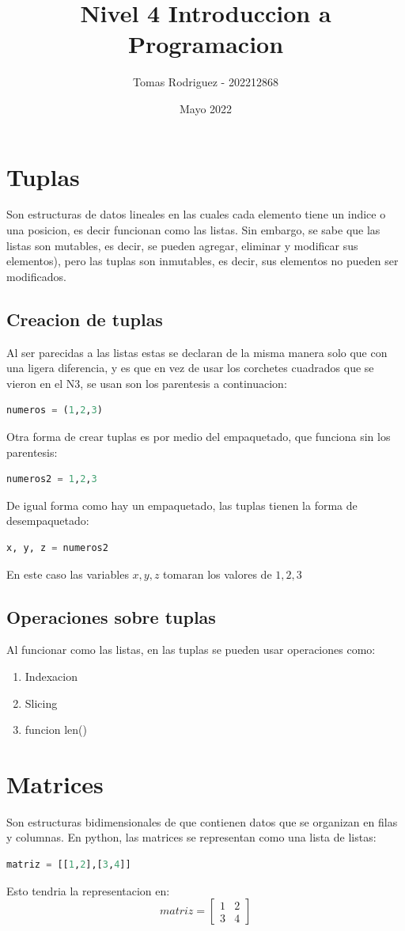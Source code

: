 \documentclass{article}
\title{Nivel 4 Introduccion a Programacion}
\author{Tomas Rodriguez - 202212868}
\date{Mayo 2022}
\begin{document}
\maketitle
\section{Tuplas}
Son estructuras de datos lineales en las cuales cada elemento tiene un indice o una posicion, es decir funcionan como las listas. Sin embargo, se sabe que las listas son mutables, es decir, se pueden agregar, eliminar y modificar sus elementos), pero las tuplas  son inmutables, es decir, sus elementos no pueden ser modificados.
\subsection{Creacion de tuplas}
Al ser parecidas a las listas estas se declaran de la misma manera solo que con una ligera diferencia, y es que en vez de usar los corchetes cuadrados que se vieron en el N3, se usan son los parentesis a continuacion:
\begin{lstlisting}[language=Python, caption= Declaracion Tupla parentesis]
numeros = (1,2,3)
\end{lstlisting}
Otra forma de crear tuplas es por medio del empaquetado, que funciona sin los parentesis:
\begin{lstlisting}[language=Python, caption= Empaquetado en tuplas]
numeros2 = 1,2,3
\end{lstlisting}
De igual forma como hay un empaquetado, las tuplas tienen la forma de desempaquetado:
\begin{lstlisting}[language=Python, caption= Desempaquedato en tuplas]
x, y, z = numeros2
\end{lstlisting}
En este caso las variables \(x,y,z\) tomaran los valores de \(1,2,3\)
\subsection{Operaciones sobre tuplas}
Al funcionar como las listas, en las tuplas se pueden usar operaciones como:
\begin{enumerate}
    \item Indexacion
    \item Slicing
    \item funcion len()
\end{enumerate}
\section{Matrices}
Son estructuras bidimensionales de que contienen datos que se organizan en filas y columnas. En python, las matrices se representan como una lista de listas:
\begin{lstlisting}[language=Python, caption= Matriz en python]
matriz = [[1,2],[3,4]]
\end{lstlisting}
Esto tendria la representacion en:
\[
matriz = 
\begin{bmatrix}
    1 & 2\\
    3 & 4    
\end{bmatrix}
\]
\end{document}
